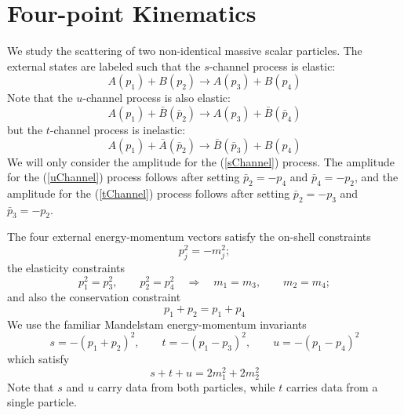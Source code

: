 \section{Four-point Kinematics\label{app1}}
We study the scattering of two non-identical massive scalar particles. The external states are labeled such that the $s$-channel process is elastic:
\begin{equation}
	A(p_{1}) + B(p_{2}) \longrightarrow A(p_{3}) + B(p_{4}) \label{sChannel}
\end{equation}
Note that the $u$-channel process is also elastic:
\begin{equation}
	A(p_{1}) + \bar{B}(\bar{p}_{2}) \longrightarrow A(p_{3}) + \bar{B}(\bar{p}_{4}) \label{uChannel}
\end{equation}
but the $t$-channel process is inelastic:
\begin{equation}
	A(p_{1}) + \bar{A}(\bar{p}_{2}) \longrightarrow \bar{B}(\bar{p}_{3}) + B(p_{4}) \label{tChannel}
\end{equation}
We will only consider the amplitude for the (\ref{sChannel}) process. The amplitude for the (\ref{uChannel}) process follows after setting $\bar{p}_{2} = -p_{4}$ and $\bar{p}_{4} = -p_{2}$, and the amplitude for the (\ref{tChannel}) process follows after setting $\bar{p}_{2} = -p_{3}$ and $\bar{p}_{3} = -p_{2}$.

The four external energy-momentum vectors satisfy the on-shell constraints
\begin{equation}
	p_{j}^{2} = - m_{j}^{2};
\end{equation}
the elasticity constraints
\begin{equation}
	p_{1}^{2} = p_{3}^{2}, \qquad p_{2}^{2} = p_{4}^{2} \quad \Longrightarrow \quad m_{1} = m_{3}, \qquad m_{2} = m_{4}; \label{elas}
\end{equation}
and also the conservation constraint
\begin{equation}
	p_{1} + p_{2} = p_{1} + p_{4}
\end{equation}
We use the familiar Mandelstam energy-momentum invariants
\begin{equation}
	s = -(p_{1} + p_{2})^{2}, \qquad t = -(p_{1} - p_{3})^{2}, \qquad u = -(p_{1} - p_{4})^{2}
\end{equation}
which satisfy
\begin{equation}
	s + t + u = 2 m_{1}^{2} + 2 m_{2}^{2}
\end{equation}
Note that $s$ and $u$ carry data from both particles, while $t$ carries data from a single particle.

